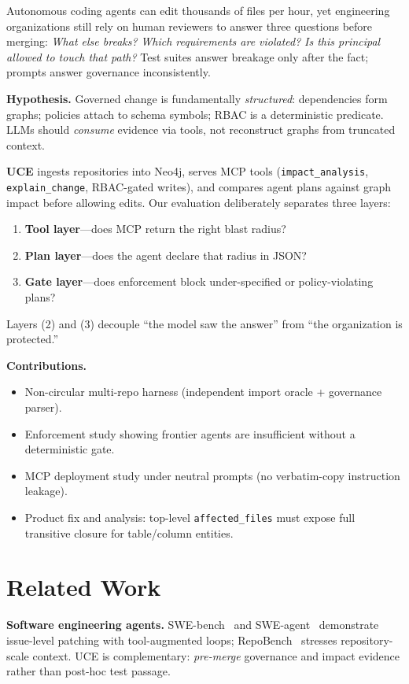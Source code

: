 \documentclass[conference]{IEEEtran}
\begin{document}
Autonomous coding agents can edit thousands of files per hour, yet engineering organizations still rely on human reviewers to answer three questions before merging: \emph{What else breaks?} \emph{Which requirements are violated?} \emph{Is this principal allowed to touch that path?}
Test suites answer breakage only after the fact; prompts answer governance inconsistently.

\textbf{Hypothesis.} Governed change is fundamentally \emph{structured}: dependencies form graphs; policies attach to schema symbols; RBAC is a deterministic predicate.
LLMs should \emph{consume} evidence via tools, not reconstruct graphs from truncated context.

\textbf{UCE} ingests repositories into Neo4j, serves MCP tools (\texttt{impact\_analysis}, \texttt{explain\_change}, RBAC-gated writes), and compares agent plans against graph impact before allowing edits.
Our evaluation deliberately separates three layers:
\begin{enumerate}
  \item \textbf{Tool layer}---does MCP return the right blast radius?
  \item \textbf{Plan layer}---does the agent declare that radius in JSON?
  \item \textbf{Gate layer}---does enforcement block under-specified or policy-violating plans?
\end{enumerate}
Layers (2) and (3) decouple ``the model saw the answer'' from ``the organization is protected.''

\textbf{Contributions.}
\begin{itemize}
  \item Non-circular multi-repo harness (independent import oracle + governance parser).
  \item Enforcement study showing frontier agents are insufficient without a deterministic gate.
  \item MCP deployment study under neutral prompts (no verbatim-copy instruction leakage).
  \item Product fix and analysis: top-level \texttt{affected\_files} must expose full transitive closure for table/column entities.
\end{itemize}

\section{Related Work}
\label{sec:related}

\textbf{Software engineering agents.}
SWE-bench~\cite{jimenez2024swebench} and SWE-agent~\cite{yang2024sweagent} demonstrate issue-level patching with tool-augmented loops; RepoBench~\cite{liu2023repobench} stresses repository-scale context.
UCE is complementary: \emph{pre-merge} governance and impact evidence rather than post-hoc test passage.
\end{document}
